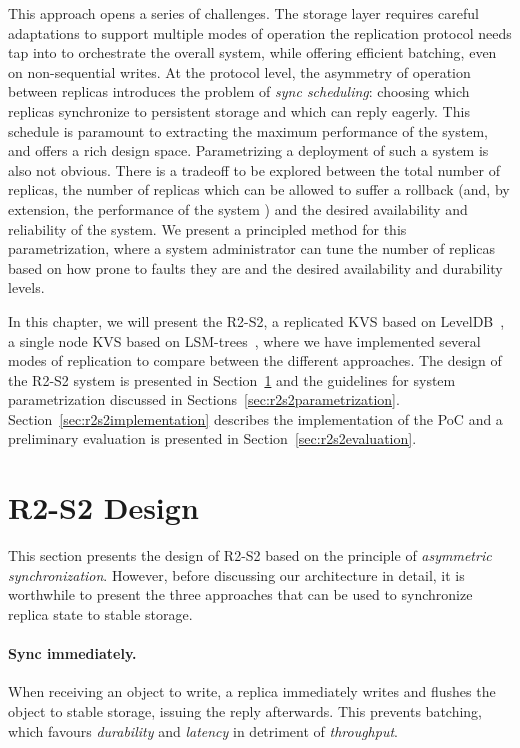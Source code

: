 This approach opens a series of challenges. The storage layer
requires careful adaptations to support multiple modes of
operation the replication protocol needs tap into to orchestrate
the overall system, while offering efficient batching, even on
non-sequential writes. At the protocol level, the asymmetry of
operation between replicas introduces the problem of \emph{sync
scheduling}: choosing which replicas synchronize to persistent storage
and which can reply eagerly. This schedule is paramount to
extracting the maximum performance of the system, and offers a
rich design space. Parametrizing a deployment of such a system is
also not obvious. There is a tradeoff to be explored between the
total number of replicas, the number of replicas which can be
allowed to suffer a rollback (and, by extension, the performance
of the system ) and the desired
availability and reliability of the system. We present a
principled method for this parametrization, where a system
administrator can tune the number of replicas based on how prone
to faults they are and the desired availability and durability
levels.

In this chapter, we will present the \acf{R2-S2}, a replicated
\ac{KVS} based on LevelDB~\cite{leveldb}, a single node \ac{KVS}
based on \acp{LSM-tree}~\cite{lsm}, where we have implemented several modes
of replication to compare between the different approaches. The
design of the \ac{R2-S2} system is presented in
Section~\ref{sec:r2s2design} and the guidelines for system
parametrization discussed in
Sections~\ref{sec:r2s2parametrization}.
Section~\ref{sec:r2s2implementation} describes the implementation
of the PoC and a preliminary evaluation is presented in
Section~\ref{sec:r2s2evaluation}.

\section{\ac{R2-S2} Design}\label{sec:r2s2design}

This section presents the design of \ac{R2-S2}
based on the principle of \emph{asymmetric synchronization}. However,
before discussing our architecture in detail, it is worthwhile to
present the three approaches that can be used to synchronize
replica state to stable storage.

\paragraph{Sync immediately.} When receiving an object to write, a
replica immediately writes and flushes the object to stable
storage, issuing the reply afterwards. This prevents batching,
which favours \emph{durability} and \emph{latency} in detriment
of \emph{throughput}.

